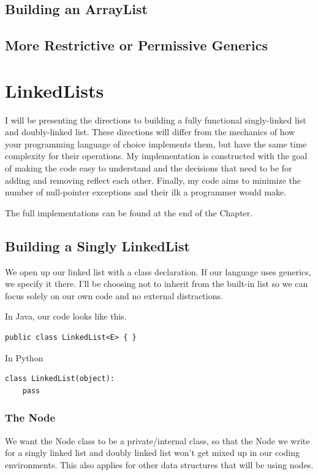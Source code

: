 \documentclass[10pt,a4paper]{book}
\begin{document}
\subsection{Building an ArrayList}
\label{buildingArraylist}

\subsection{More Restrictive or Permissive Generics}


\section{LinkedLists}


I will be presenting the directions to building a fully functional  singly-linked list and doubly-linked list.  
These directions will differ from the mechanics of how your programming language of choice implements them, but have the same time complexity for their operations.
My implementation is constructed with the goal of making the code easy to understand and the decisions that need to be for adding and removing reflect each other.
Finally, my code aims to minimize the number of null-pointer exceptions and their ilk a programmer would make.

The full implementations can be found at the end of the Chapter.

\subsection{Building a Singly LinkedList}
We open up our linked list with a class declaration. 
If our language uses generics, we specify it there.
I'll be choosing not to inherit from the built-in list so we can focus solely on our own code and no external distractions.


In Java, our code looks like this.
\begin{verbatim}
public class LinkedList<E> { }
\end{verbatim}


In Python
\begin{verbatim}
class LinkedList(object):
	pass
\end{verbatim}


\subsubsection{The Node}
We want the Node class to be a private/internal class, so that the Node we write for a singly linked list and doubly linked list won't get mixed up in our coding environments.
This also applies for other data structures that will be using nodes.
\end{document}

